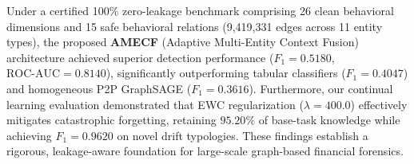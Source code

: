 \documentclass[conference]{IEEEtran}
\begin{document}
Under a certified 100\% zero-leakage benchmark comprising 26 clean behavioral dimensions and 15 safe behavioral relations (9,419,331 edges across 11 entity types), the proposed \textbf{AMECF} (Adaptive Multi-Entity Context Fusion) architecture achieved superior detection performance ($F_1 = 0.5180$, $\text{ROC-AUC} = 0.8140$), significantly outperforming tabular classifiers ($F_1 = 0.4047$) and homogeneous P2P GraphSAGE ($F_1 = 0.3616$). Furthermore, our continual learning evaluation demonstrated that EWC regularization ($\lambda = 400.0$) effectively mitigates catastrophic forgetting, retaining $95.20\%$ of base-task knowledge while achieving $F_1 = 0.9620$ on novel drift typologies. These findings establish a rigorous, leakage-aware foundation for large-scale graph-based financial forensics.



\end{document}
